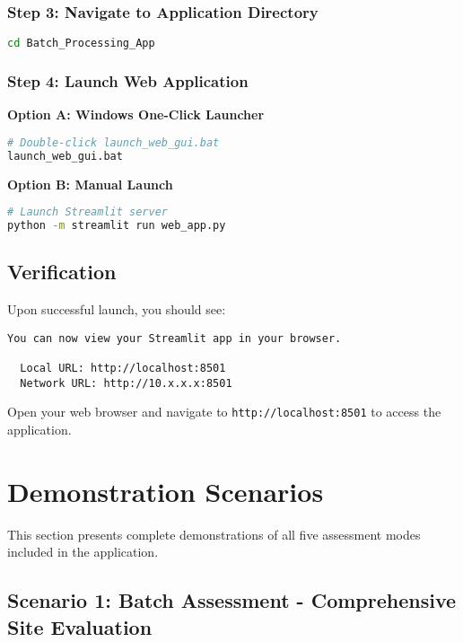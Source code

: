 \documentclass[11pt,a4paper]{article}
\begin{document}
\subsubsection{Step 3: Navigate to Application Directory}

\begin{lstlisting}[style=bashstyle, language=bash]
cd Batch_Processing_App
\end{lstlisting}

\subsubsection{Step 4: Launch Web Application}

\textbf{Option A: Windows One-Click Launcher}
\begin{lstlisting}[style=bashstyle, language=bash]
# Double-click launch_web_gui.bat
launch_web_gui.bat
\end{lstlisting}

\textbf{Option B: Manual Launch}
\begin{lstlisting}[style=bashstyle, language=bash]
# Launch Streamlit server
python -m streamlit run web_app.py
\end{lstlisting}

\subsection{Verification}

Upon successful launch, you should see:

\begin{lstlisting}[style=bashstyle]
  You can now view your Streamlit app in your browser.

  Local URL: http://localhost:8501
  Network URL: http://10.x.x.x:8501
\end{lstlisting}

Open your web browser and navigate to \texttt{http://localhost:8501} to access the application.

\newpage

\section{Demonstration Scenarios}

This section presents complete demonstrations of all five assessment modes included in the application.

\subsection{Scenario 1: Batch Assessment - Comprehensive Site Evaluation}
\end{document}
